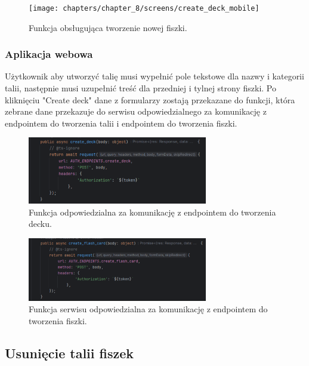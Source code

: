 \begin{figure}[H]
    \centering
    \texttt{[image: chapters/chapter\_8/screens/create\_deck\_mobile]}
    \caption{Funkcja obsługująca tworzenie nowej fiszki.}
    \label{img:create_deck_mobile}
\end{figure}

\subsubsection{Aplikacja webowa}

Użytkownik aby utworzyć talię musi wypełnić pole tekstowe dla nazwy i kategorii talii, następnie musi uzupełnić treść dla przedniej i tylnej strony fiszki. Po kliknięciu "Create deck" dane z formularzy zostają przekazane do funkcji, która zebrane dane przekazuje do serwisu odpowiedzialnego za komunikację z endpointem do tworzenia talii i endpointem do tworzenia fiszki.

\begin{figure}[H]
    \centering
    \includegraphics[width=0.7\textwidth]{chapters/chapter_8/screens/create_deck_web}
    \caption{Funkcja odpowiedzialna za komunikację z endpointem do tworzenia decku.}
    \label{img:create_deck_web}
\end{figure}

\begin{figure}[H]
    \centering
    \includegraphics[width=0.7\textwidth]{chapters/chapter_8/screens/create_flash_card_web}
    \caption{Funkcja serwisu odpowiedzialna za komunikację z endpointem do tworzenia fiszki.}
    \label{img:create_flash_card_web}
\end{figure}

\subsection{Usunięcie talii fiszek}

